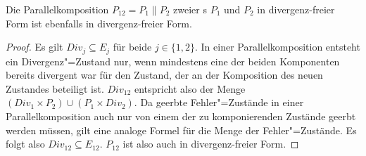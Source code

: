 \begin{Lem}
  \label{DivFreiParallelLem}
  Die Parallelkomposition $P_{12} = P_1\|P_2$ zweier \MEIO{}s $P_1$ und $P_2$
  in divergenz-freier Form ist ebenfalls in divergenz-freier Form.
\end{Lem}
\begin{proof}
  Es gilt $Div _j \subseteq E_j$ für beide $j\in\{1,2\}$. In einer
  Parallelkomposition entsteht ein Divergenz"=Zustand nur, wenn mindestens
  eine der beiden Komponenten bereits divergent war für den Zustand, der an der
  Komposition des neuen Zustandes beteiligt ist. $Div _{12}$ entspricht
  also der Menge $(Div _1 \times P_2) \cup (P_1 \times Div _2)$. Da geerbte
  Fehler"=Zustände in einer Parallelkomposition auch nur von einem der zu
  komponierenden Zustände geerbt werden müssen, gilt eine analoge Formel für
  die Menge der Fehler"=Zustände. Es folgt also $Div _{12} \subseteq E _{12}$.
  $P_{12}$ ist also auch in divergenz-freier Form.
\end{proof}

